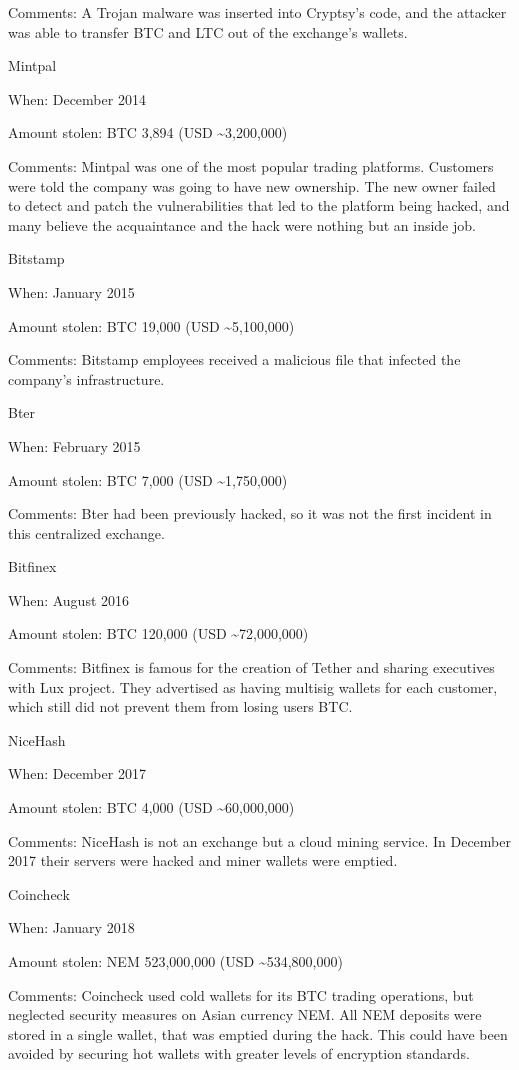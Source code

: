 \documentclass[11pt]{article}
\begin{document}
Comments: A Trojan malware was inserted into Cryptsy's code, and the attacker was able to transfer BTC and LTC out of the exchange's wallets.


Mintpal


When: December 2014


Amount stolen: BTC 3,894 (USD \textasciitilde{}3,200,000)


Comments: Mintpal was one of the most popular trading platforms. Customers were told the company was going to have new ownership. The new owner failed to detect and patch the vulnerabilities that led to the platform being hacked, and many believe the acquaintance and the hack were nothing but an inside job.


Bitstamp


When: January 2015


Amount stolen: BTC 19,000 (USD \textasciitilde{}5,100,000)


Comments: Bitstamp employees received a malicious file that infected the company's infrastructure.


Bter


When: February 2015


Amount stolen: BTC 7,000 (USD \textasciitilde{}1,750,000)


Comments: Bter had been previously hacked, so it was not the first incident in this centralized exchange.


Bitfinex


When: August 2016


Amount stolen: BTC 120,000 (USD \textasciitilde{}72,000,000)


Comments: Bitfinex is famous for the creation of Tether and sharing executives with Lux  project. They advertised as having multisig wallets for each customer, which still did not prevent them from losing users BTC.


NiceHash


When: December 2017


Amount stolen: BTC 4,000 (USD \textasciitilde{}60,000,000)


Comments: NiceHash is not an exchange but a cloud mining service. In December 2017 their servers were hacked and miner wallets were emptied.


Coincheck


When: January 2018


Amount stolen: NEM 523,000,000 (USD \textasciitilde{}534,800,000)


Comments: Coincheck used cold wallets for its BTC trading operations, but neglected security measures on Asian currency NEM. All NEM deposits were stored in a single wallet, that was emptied during the hack. This could have been avoided by securing hot wallets with greater levels of encryption standards.
\end{document}
